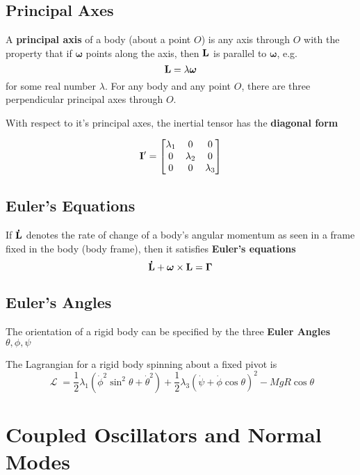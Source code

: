 \documentclass{article}
\DeclareMathOperator{\Lagr}{\mathcal{L}}
\begin{document}
\subsection{Principal Axes}
A \textbf{principal axis} of a body (about a point $O$) is any axis through $O$ with the property that if $\bm\omega$ points along the axis, then $\vb{L}$ is parallel to $\bm\omega$, e.g.
$$
\vb{L} = \lambda \bm\omega
$$
for some real number $\lambda$.  For any body and any point $O$, there are three perpendicular principal axes through $O$.

With respect to it's principal axes, the inertial tensor has the \textbf{diagonal form}

$$
\vb{I'} = \begin{bmatrix}
    \lambda_1 & 0 & 0 \\
    0 & \lambda_2 & 0 \\
    0 & 0 & \lambda_3 \\
  \end{bmatrix}
$$
\subsection{Euler's Equations}
If $\vb{\dot{L}}$ denotes the rate of change of a body's angular momentum as seen in a frame fixed in the body (body frame), then it satisfies \textbf{Euler's equations}
$$
\vb{\dot{L}} + \bm \omega \times \vb{L} = \bm \Gamma
$$
\subsection{Euler's Angles}
The orientation of a rigid body can be specified by the three \textbf{Euler Angles} $\theta, \phi, \psi$ 

The Lagrangian for a rigid body spinning about a fixed pivot is
$$
\Lagr = \frac{1}{2} \lambda_1 (\dot\phi^2 \sin^2\theta + \dot\theta^2) + \frac{1}{2} \lambda_3(\dot\psi + \dot\phi \cos\theta)^2 - M g R \cos\theta
$$

\section{Coupled Oscillators and Normal Modes}
\end{document}
